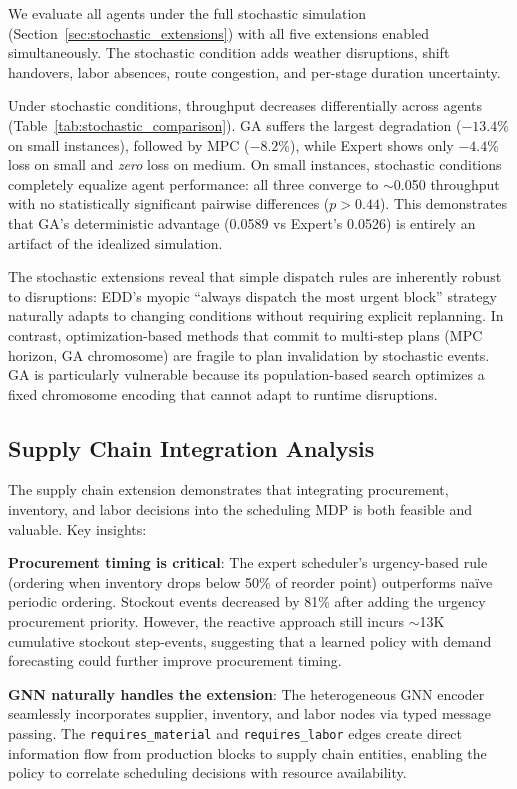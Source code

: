 \documentclass[11pt,a4paper]{article}
\begin{document}
We evaluate all agents under the full stochastic simulation (Section~\ref{sec:stochastic_extensions}) with all five extensions enabled simultaneously. The stochastic condition adds weather disruptions, shift handovers, labor absences, route congestion, and per-stage duration uncertainty.

Under stochastic conditions, throughput decreases differentially across agents (Table~\ref{tab:stochastic_comparison}). GA suffers the largest degradation ($-13.4\%$ on small instances), followed by MPC ($-8.2\%$), while Expert shows only $-4.4\%$ loss on small and \textit{zero} loss on medium. On small instances, stochastic conditions completely equalize agent performance: all three converge to $\sim$0.050 throughput with no statistically significant pairwise differences ($p > 0.44$). This demonstrates that GA's deterministic advantage (0.0589 vs Expert's 0.0526) is entirely an artifact of the idealized simulation.

The stochastic extensions reveal that simple dispatch rules are inherently robust to disruptions: EDD's myopic ``always dispatch the most urgent block'' strategy naturally adapts to changing conditions without requiring explicit replanning. In contrast, optimization-based methods that commit to multi-step plans (MPC horizon, GA chromosome) are fragile to plan invalidation by stochastic events. GA is particularly vulnerable because its population-based search optimizes a fixed chromosome encoding that cannot adapt to runtime disruptions.

\subsection{Supply Chain Integration Analysis}

The supply chain extension demonstrates that integrating procurement, inventory, and labor decisions into the scheduling MDP is both feasible and valuable. Key insights:

\textbf{Procurement timing is critical}: The expert scheduler's urgency-based rule (ordering when inventory drops below 50\% of reorder point) outperforms na\"ive periodic ordering. Stockout events decreased by 81\% after adding the urgency procurement priority. However, the reactive approach still incurs $\sim$13K cumulative stockout step-events, suggesting that a learned policy with demand forecasting could further improve procurement timing.

\textbf{GNN naturally handles the extension}: The heterogeneous GNN encoder seamlessly incorporates supplier, inventory, and labor nodes via typed message passing. The \texttt{requires\_material} and \texttt{requires\_labor} edges create direct information flow from production blocks to supply chain entities, enabling the policy to correlate scheduling decisions with resource availability.
\end{document}
